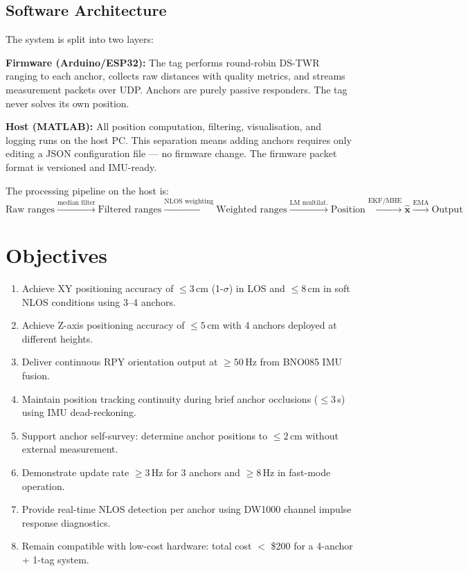 \documentclass[11pt,a4paper]{article}
\newcommand{\vect}[1]{\bm{#1}}
\begin{document}
\subsection{Software Architecture}

The system is split into two layers:

\textbf{Firmware (Arduino/ESP32):} The tag performs round-robin DS-TWR ranging to each anchor, collects raw distances with quality metrics, and streams measurement packets over UDP. Anchors are purely passive responders. The tag never solves its own position.

\textbf{Host (MATLAB):} All position computation, filtering, visualisation, and logging runs on the host PC. This separation means adding anchors requires only editing a JSON configuration file --- no firmware change. The firmware packet format is versioned and IMU-ready.

The processing pipeline on the host is:
\[
\text{Raw ranges} \xrightarrow{\text{median filter}} \text{Filtered ranges} \xrightarrow{\text{NLOS weighting}} \text{Weighted ranges} \xrightarrow{\text{LM multilat.}} \text{Position} \xrightarrow{\text{EKF/MHE}} \hat{\vect{x}} \xrightarrow{\text{EMA}} \text{Output}
\]

\section{Objectives}

\begin{enumerate}[leftmargin=2em, label=\textbf{O\arabic*.}]
  \item Achieve XY positioning accuracy of $\leq 3$\,cm (1-$\sigma$) in LOS and $\leq 8$\,cm in soft NLOS conditions using 3--4 anchors.
  \item Achieve Z-axis positioning accuracy of $\leq 5$\,cm with 4 anchors deployed at different heights.
  \item Deliver continuous RPY orientation output at $\geq 50$\,Hz from BNO085 IMU fusion.
  \item Maintain position tracking continuity during brief anchor occlusions ($\leq 3$\,s) using IMU dead-reckoning.
  \item Support anchor self-survey: determine anchor positions to $\leq 2$\,cm without external measurement.
  \item Demonstrate update rate $\geq 3$\,Hz for 3 anchors and $\geq 8$\,Hz in fast-mode operation.
  \item Provide real-time NLOS detection per anchor using DW1000 channel impulse response diagnostics.
  \item Remain compatible with low-cost hardware: total cost $<$ \$200 for a 4-anchor + 1-tag system.
\end{enumerate}
\end{document}
